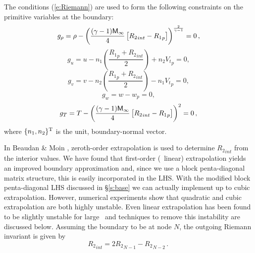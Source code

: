 The conditions (\ref{e:Riemann}) are used to form the following constraints on
the primitive variables at the boundary:
%
\begin{equation}
  g_\rho = \rho - \left( \frac{(\gamma-1){\sf M}_\infty}{4}
        \left[ {R_2}_{int} - {R_1}_p \right] \right)^\frac{2}{\gamma-1} 
	= 0{\, ,}
\end{equation}
%
\begin{equation}
  g_u = u - n_1 \left(\frac{{R_1}_{p} + {R_2}_{int}}{2}\right) + 
            n_2 {V_t}_p = 0 \comma
\end{equation}
%
\begin{equation}
  g_v = v - n_2 \left(\frac{{R_1}_{p} + {R_2}_{int}}{2}\right) - 
            n_1 {V_t}_p = 0 \comma
\end{equation}
%
\begin{equation}
  g_w = w - w_p = 0 \comma
\end{equation}
%
\begin{equation}
  g_T = T - \left(\frac{(\gamma-1){\sf M}_\infty}{4}
            \left[ {R_2}_{int} - {R_1}_p \right ] \right)^2 = 0 {\, ,}
\end{equation}
%
where $\{n_1,n_2\}^{\rm T}$ is the unit, boundary-normal vector.  

In Beaudan \& Moin \cite{BeMo:94}, zeroth-order extrapolation is used to
determine ${R_2}_{int}$ from the interior values.  We have found that
first-order (\ie\ linear) extrapolation yields an improved boundary
approximation and, since we use a block penta-diagonal matrix structure, this
is easily incorporated in the LHS.  With the modified block penta-diagonal LHS
discussed in \S\ref{s:base} we can actually implement up to cubic
extrapolation.  However, numerical experiments show that quadratic and cubic
extrapolation are both highly unstable.  Even linear extrapolation has been
found to be slightly unstable for large \CFL\ and techniques to remove this
instability are discussed below.  Assuming the boundary to be at node $N$, the
outgoing Riemann invariant is given by
%
\begin{equation}
  {R_2}_{int} = 2 {R_2}_{N-1} - {R_2}_{N-2} \period
\end{equation}

